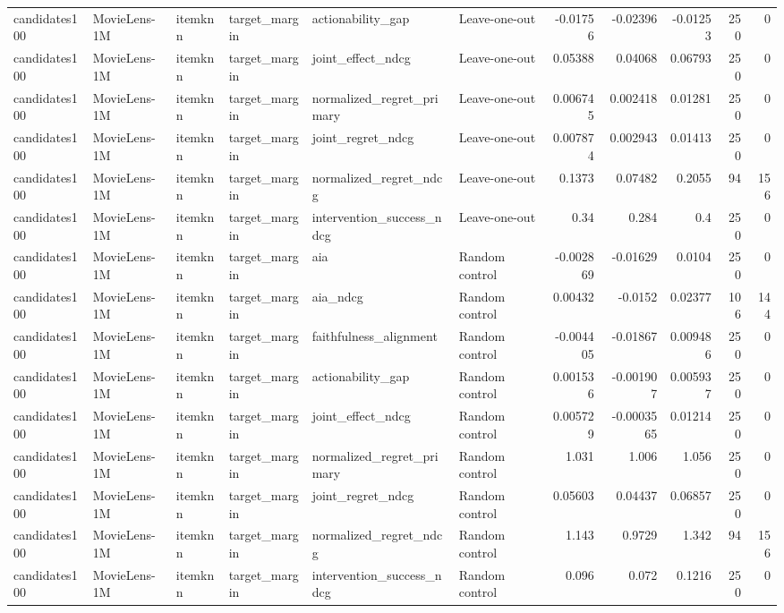 \begin{table}[t]
{\begin{tabular}{llllllrrrrr}
candidates100 & MovieLens-1M & itemknn & target\_margin & actionability\_gap & Leave-one-out & -0.01756 & -0.02396 & -0.01253 & 250 & 0 \\
candidates100 & MovieLens-1M & itemknn & target\_margin & joint\_effect\_ndcg & Leave-one-out & 0.05388 & 0.04068 & 0.06793 & 250 & 0 \\
candidates100 & MovieLens-1M & itemknn & target\_margin & normalized\_regret\_primary & Leave-one-out & 0.006745 & 0.002418 & 0.01281 & 250 & 0 \\
candidates100 & MovieLens-1M & itemknn & target\_margin & joint\_regret\_ndcg & Leave-one-out & 0.007874 & 0.002943 & 0.01413 & 250 & 0 \\
candidates100 & MovieLens-1M & itemknn & target\_margin & normalized\_regret\_ndcg & Leave-one-out & 0.1373 & 0.07482 & 0.2055 & 94 & 156 \\
candidates100 & MovieLens-1M & itemknn & target\_margin & intervention\_success\_ndcg & Leave-one-out & 0.34 & 0.284 & 0.4 & 250 & 0 \\
candidates100 & MovieLens-1M & itemknn & target\_margin & aia & Random control & -0.002869 & -0.01629 & 0.0104 & 250 & 0 \\
candidates100 & MovieLens-1M & itemknn & target\_margin & aia\_ndcg & Random control & 0.00432 & -0.0152 & 0.02377 & 106 & 144 \\
candidates100 & MovieLens-1M & itemknn & target\_margin & faithfulness\_alignment & Random control & -0.004405 & -0.01867 & 0.009486 & 250 & 0 \\
candidates100 & MovieLens-1M & itemknn & target\_margin & actionability\_gap & Random control & 0.001536 & -0.001907 & 0.005937 & 250 & 0 \\
candidates100 & MovieLens-1M & itemknn & target\_margin & joint\_effect\_ndcg & Random control & 0.005729 & -0.0003565 & 0.01214 & 250 & 0 \\
candidates100 & MovieLens-1M & itemknn & target\_margin & normalized\_regret\_primary & Random control & 1.031 & 1.006 & 1.056 & 250 & 0 \\
candidates100 & MovieLens-1M & itemknn & target\_margin & joint\_regret\_ndcg & Random control & 0.05603 & 0.04437 & 0.06857 & 250 & 0 \\
candidates100 & MovieLens-1M & itemknn & target\_margin & normalized\_regret\_ndcg & Random control & 1.143 & 0.9729 & 1.342 & 94 & 156 \\
candidates100 & MovieLens-1M & itemknn & target\_margin & intervention\_success\_ndcg & Random control & 0.096 & 0.072 & 0.1216 & 250 & 0 \\

\end{tabular}}
\end{table}
